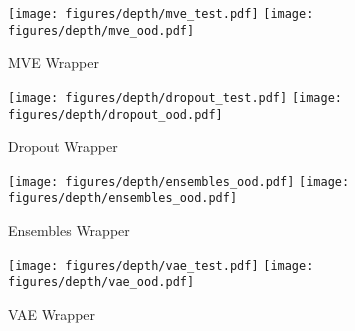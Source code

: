 \documentclass{article} %
\begin{document}

\begin{figure*}[h!]
 \texttt{[image: figures/depth/mve\_test.pdf]} \hfill
 \texttt{[image: figures/depth/mve\_ood.pdf]} \\
\caption{MVE Wrapper}
\label{fig:depth_mve}
\end{figure*}

\begin{figure*}[h!]
 \texttt{[image: figures/depth/dropout\_test.pdf]} \hfill
 \texttt{[image: figures/depth/dropout\_ood.pdf]} \\
\caption{Dropout Wrapper}
\label{fig:depth_dropout}
\end{figure*}

\begin{figure*}[h!]
 \texttt{[image: figures/depth/ensembles\_ood.pdf]} \hfill
 \texttt{[image: figures/depth/ensembles\_ood.pdf]} \\
\caption{Ensembles Wrapper}
\label{fig:depth_ensemble}
\end{figure*}

\begin{figure*}[h!]
 \texttt{[image: figures/depth/vae\_test.pdf]} \hfill
 \texttt{[image: figures/depth/vae\_ood.pdf]} \\
\caption{VAE Wrapper}
\label{fig:depth_vae}
\end{figure*}
\end{document}
